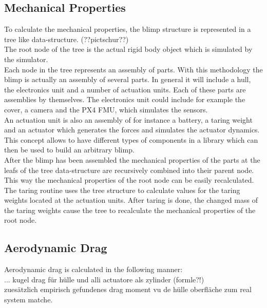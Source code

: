 \subsection{Mechanical Properties}
\label{sub:mech_properties}
To calculate the mechanical properties, the blimp structure is represented in a tree like data-structure. (??pictschur??)\\
The root node of the tree is the actual rigid body object which is simulated by the simulator.\\
Each node in the tree represents an assembly of parts.
With this methodology the blimp is actually an assembly of several parts. 
In general it will include a hull, the electronics unit and a number of actuation units.
Each of these parts are assemblies by themselves.
The electronics unit could include for example the cover, a camera and the PX4 FMU, which simulates the sensors.\\
An actuation unit is also an assembly of for instance a battery, a taring weight and an actuator which generates the forces and simulates the actuator dynamics.\\
This concept allows to have different types of components in a library which can then be used to build an arbitrary blimp.\\
After the blimp has been assembled the mechanical properties of the parts at the leafs of the tree data-structure are recursively combined into their parent node. 
This way the mechanical properties of the root node can be easily recalculated.\\
The taring routine uses the tree structure to calculate values for the taring weights located at the actuation units. 
After taring is done, the changed mass of the taring weights cause the tree to recalculate the mechanical properties of the root node.

\subsection{Aerodynamic Drag}
\label{sub:aero_drag}
Aerodynamic drag is calculated in the following manner:\\
... kugel drag für hülle und alli actuatore als zylinder (formle?!) \\
zuesätzlich empirisch gefundenes drag moment vu de hülle oberfläche zum real system matche. \\

